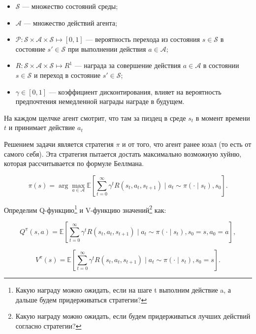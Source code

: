 \begin{itemize}[label=---]
	\item \(\mathcal{S}\) --- множество состояний среды;
	\item \( \mathcal{A} \) --- множество действий агента;
	\item \( \mathcal{P}: \mathcal{S} \times \mathcal{A} \times \mathcal{S} \mapsto [0, 1] \) --- вероятность перехода из состояния \( s \in \mathcal{S} \) в состояние \( s' \in \mathcal{S} \) при выполнении действия \( a \in \mathcal{A} \);
	\item \( R: \mathcal{S} \times \mathcal{A} \times \mathcal{S} \mapsto R^1 \) --- награда за совершение действия \( a \in \mathcal{A} \) в состоянии \( s \in \mathcal{S} \) и переход в состояние \( s' \in \mathcal{S} \);
	\item \( \gamma \in [0, 1] \) --- коэффициент дисконтирования, влияет на вероятность предпочтения немедленной награды награде в будущем.
\end{itemize}

На каждом щелчке агент смотрит, что там за пиздец в среде \(s_t\) в момент времени \(t\) и принимает действие \(a_t\)

Решением задачи является стратегия \( \pi \) и от того, что агент ранее юзал (то есть от самого себя). Эта стратегия пытается достать максимально возможную хуйню, которая рассчитывается по формуле Беллмана.

\begin{equation}
	\pi(s) = \arg\max_{a \in \mathcal{A}} \mathbb{E} \left[ \sum_{t=0}^{\infty} \gamma^t R(s_t, a_t, s_{t+1}) \mid a_t \sim \pi(\cdot \mid s_t), s_0 \right].
	\label{eq:Q}
\end{equation}


Определим Q-функцию\footnote{Какую награду можно ожидать, если на шаге t выполним действие a, а дальше будем придерживаться стратегии?} и V-функцию значений\footnote{Какую награду можно ожидать, если будем придерживаться лучших действий согласно стратегии?} как:

\begin{equation}
	Q^{\pi}(s, a) = \mathbb{E} \left[ \sum_{t=0}^{\infty} \gamma^t R(s_t, a_t, s_{t+1}) \mid a_t \sim \pi(\cdot \mid s_t), s_0 = s, a_0 = a \right],
	\label{eq:V}
\end{equation}


\begin{equation}
	V^{\pi}(s) = \mathbb{E} \left[ \sum_{t=0}^{\infty} \gamma^t R(s_t, a_t, s_{t+1}) \mid a_t \sim \pi(\cdot \mid s_t), s_0 = s \right].
\end{equation}

